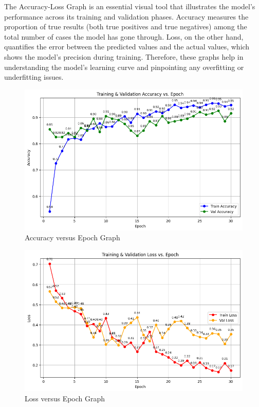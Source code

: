 The Accuracy-Loss Graph is an essential visual tool that illustrates the model's performance across its training and validation phases. Accuracy measures the proportion of true results (both true positives and true negatives) among the total number of cases the model has gone through. Loss, on the other hand, quantifies the error between the predicted values and the actual values, which shows the model's precision during training. Therefore, these graphs help in understanding the model's learning curve and pinpointing any overfitting or underfitting issues.

\begin{figure}[htbp]
    \centering
    \includegraphics[width=1\textwidth]{Images/acc graph.png}
    \caption{Accuracy versus Epoch Graph}
    \label{fig:AccGraph}
\end{figure}

\begin{figure}[htbp]
    \centering
    \includegraphics[width=1\textwidth]{Images/loss graph.png}
    \caption{Loss versus Epoch Graph}
    \label{fig:LossGraph}
\end{figure}

